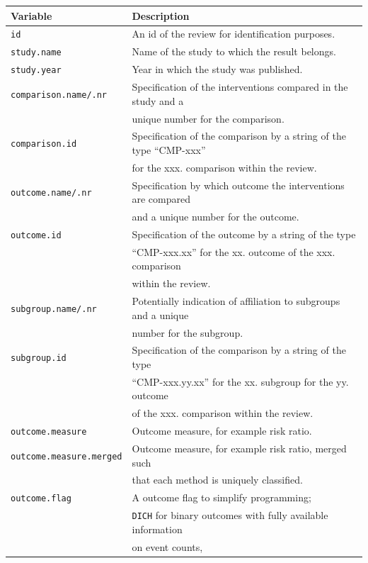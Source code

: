 \documentclass[11pt,a4paper,twoside]{book}\usepackage[]{graphicx}\usepackage[]{color}
\begin{document}
\begin{table}[ht]
  \begin{center}
    \begin{tabular}{ll}
      \textbf{Variable} & \textbf{Description}\\
      \hline
      \texttt{id} & An id of the review for identification purposes.\\
      \hline
      \texttt{study.name} & Name of the study to which the result belongs.\\
      \texttt{study.year} & Year in which the study was published.\\
      \hline
      \texttt{comparison.name/.nr} & Specification of the interventions compared in the study and a \\ &unique number for the comparison.\\
      \texttt{comparison.id} & Specification of the comparison by a string of the type ``CMP-xxx'' \\ &for the xxx. comparison within the review.\\
      \texttt{outcome.name/.nr} & Specification by which outcome the interventions are compared\\ &and a unique number for the outcome.\\
      \texttt{outcome.id} & Specification of the outcome by a string of the type \\ &``CMP-xxx.xx'' for the xx. outcome of the xxx. comparison \\ &within the review.\\
      \texttt{subgroup.name/.nr} & Potentially indication of affiliation to subgroups and a unique \\ &number for the subgroup.\\
      \texttt{subgroup.id} & Specification of the comparison by a string of the type \\ &``CMP-xxx.yy.xx'' for the xx. subgroup for the yy. outcome \\ & of the xxx. comparison within the review.\\
      \texttt{outcome.measure} & Outcome measure, for example risk ratio.\\
      \texttt{outcome.measure.merged} & Outcome measure, for example risk ratio, merged such \\ &that each method is uniquely classified.\\
      \texttt{outcome.flag} & A outcome flag to simplify programming; \\ &\texttt{DICH} for binary outcomes with fully available information \\ &on event counts,

\end{tabular}
\end{center}
\end{table}
\end{document}
